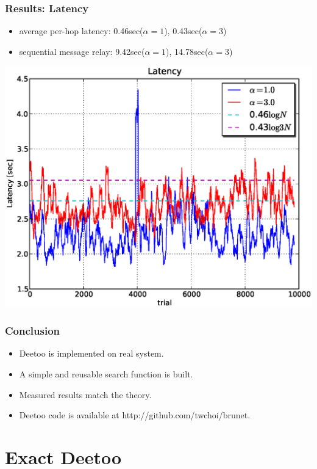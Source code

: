 \documentclass[red]{beamer}
\begin{document}
\begin{frame}
\frametitle{Results: Latency}
\begin{itemize}
\item average per-hop latency: 0.46sec($\alpha=1$), 0.43sec($\alpha=3$)
\item sequential message relay: 9.42sec($\alpha=1$), 14.78sec($\alpha=3$)
\end{itemize}
\begin{center}
\includegraphics[scale=0.4]{figs/plab_latency_sec.eps}
\end{center}
\end{frame}



\begin{frame}
\frametitle{Conclusion}
\begin{itemize}
\item Deetoo is implemented on real system.
\item A simple and reusable search function is built.
\item Measured results match the theory.
\item Deetoo code is available at http://github.com/twchoi/brunet.
\end{itemize}
\end{frame}

\section{Exact Deetoo}
\end{document}
